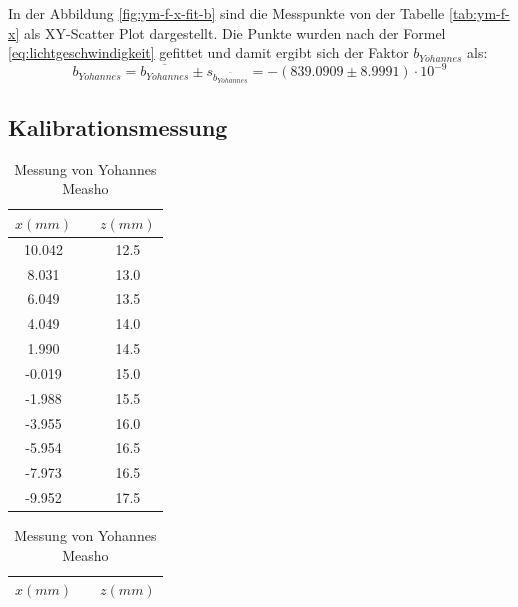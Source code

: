 In der Abbildung \ref{fig:ym-f-x-fit-b} sind  die  Messpunkte  von  der  Tabelle
\ref{tab:ym-f-x}  als  XY-Scatter  Plot  dargestellt. Die Punkte wurden nach der
Formel \ref{eq:lichtgeschwindigkeit} gefittet und damit ergibt sich  der  Faktor
$b_{Yohannes}$ als:
\begin{equation}
    b_{Yohannes} = \overline{b_{Yohannes}} \pm s_{\overline{b_{Yohannes}}} = -(839.0909 \pm 8.9991)\cdot 10^{-9}
    \label{eq:ym-b}
\end{equation}


\subsection{Kalibrationsmessung}

\begin{table}[H]
    \caption{Kalibrationsmessdaten}
    \begin{subtable}{.5\linewidth}
        \centering
        \caption{Messung von Alex Murray}
        \label{tab:am-x-z}
        \begin{tabular}{ccc}
            \toprule
            $x (mm)$ & \hspace{5mm} & $z (mm)$ \\
            \midrule
            10.042 && 12.5 \\
            8.031  && 13.0 \\
            6.049  && 13.5 \\
            4.049  && 14.0 \\
            1.990  && 14.5 \\
            -0.019 && 15.0 \\
            -1.988 && 15.5 \\
            -3.955 && 16.0 \\
            -5.954 && 16.5 \\
            -7.973 && 16.5 \\
            -9.952 && 17.5 \\
            \bottomrule
        \end{tabular}
    \end{subtable}%
    \begin{subtable}{.5\linewidth}
        \centering
        \caption{Messung von Yohannes Measho}
        \label{tab:ym-x-z}
        \begin{tabular}{ccc}
            \toprule
            $x (mm)$ & \hspace{5mm} & $z (mm)$ \\
            \midrule

\end{tabular}
\end{subtable}
\end{table}
